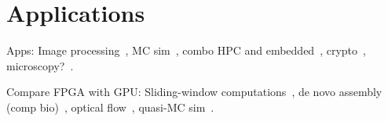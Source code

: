 \section{Applications}
\label{sec:apps}

Apps: Image processing~\cite{dbd+13}, MC sim~\cite{shsc08,tttl10},
combo HPC and embedded~\cite{rpm+15}, crypto~\cite{dfg+13},
microscopy?~\cite{tzwz15}.

Compare FPGA with GPU: Sliding-window computations~\cite{cfbs15},
de novo assembly (comp bio)~\cite{mjk+16},
optical flow~\cite{bnw+10}, quasi-MC sim~\cite{tb10}.
